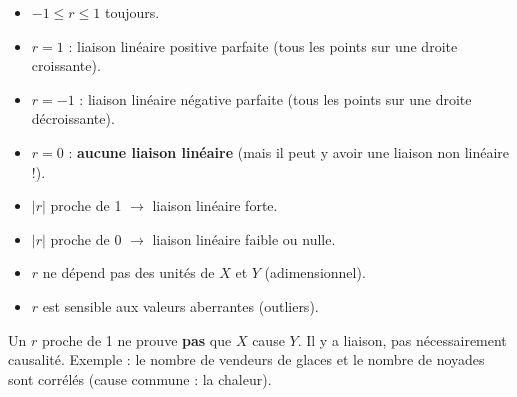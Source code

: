 \documentclass[11pt]{article}
\begin{document}
\begin{propriete}[Propriétés de $r$]
\begin{itemize}
\item $-1 \le r \le 1$ toujours.
\item $r = 1$ : liaison linéaire positive parfaite (tous les points sur une droite croissante).
\item $r = -1$ : liaison linéaire négative parfaite (tous les points sur une droite décroissante).
\item $r = 0$ : \textbf{aucune liaison linéaire} (mais il peut y avoir une liaison non linéaire !).
\item $|r|$ proche de 1 $\rightarrow$ liaison linéaire forte.
\item $|r|$ proche de 0 $\rightarrow$ liaison linéaire faible ou nulle.
\item $r$ ne dépend pas des unités de $X$ et $Y$ (adimensionnel).
\item $r$ est sensible aux valeurs aberrantes (outliers).
\end{itemize}
\end{propriete}

\begin{attention}
Un $r$ proche de 1 ne prouve \textbf{pas} que $X$ cause $Y$. Il y a liaison, pas nécessairement causalité. Exemple : le nombre de vendeurs de glaces et le nombre de noyades sont corrélés (cause commune : la chaleur).
\end{attention}
\end{document}
